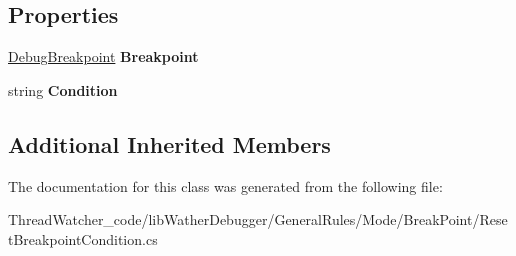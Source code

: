 \subsection*{Properties}
\begin{DoxyCompactItemize}
\item 
\hypertarget{classlib_wather_debugger_1_1_general_rules_1_1_mode_1_1_break_point_1_1_reset_breakpoint_condition_a16055a4db590b290d096e53d6c7222f0}{\hyperlink{classlib_wather_debugger_1_1_breakpoint_1_1_debug_breakpoint}{Debug\+Breakpoint} {\bfseries Breakpoint}}\label{classlib_wather_debugger_1_1_general_rules_1_1_mode_1_1_break_point_1_1_reset_breakpoint_condition_a16055a4db590b290d096e53d6c7222f0}

\item 
\hypertarget{classlib_wather_debugger_1_1_general_rules_1_1_mode_1_1_break_point_1_1_reset_breakpoint_condition_a7f097e6e08f3bafe5bf27ac5b74e5556}{string {\bfseries Condition}}\label{classlib_wather_debugger_1_1_general_rules_1_1_mode_1_1_break_point_1_1_reset_breakpoint_condition_a7f097e6e08f3bafe5bf27ac5b74e5556}

\end{DoxyCompactItemize}
\subsection*{Additional Inherited Members}


The documentation for this class was generated from the following file\+:\begin{DoxyCompactItemize}
\item 
Thread\+Watcher\+\_\+code/lib\+Wather\+Debugger/\+General\+Rules/\+Mode/\+Break\+Point/Reset\+Breakpoint\+Condition.\+cs\end{DoxyCompactItemize}
